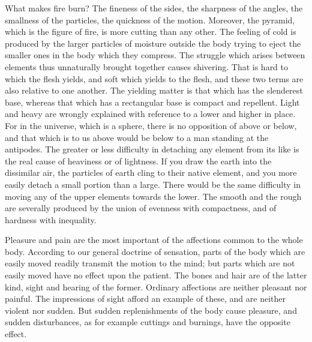 \documentclass[11pt,letter]{article}
\begin{document}
\par  What makes fire burn? The fineness of the sides, the sharpness of the angles, the smallness of the particles, the quickness of the motion. Moreover, the pyramid, which is the figure of fire, is more cutting than any other. The feeling of cold is produced by the larger particles of moisture outside the body trying to eject the smaller ones in the body which they compress. The struggle which arises between elements thus unnaturally brought together causes shivering. That is hard to which the flesh yields, and soft which yields to the flesh, and these two terms are also relative to one another. The yielding matter is that which has the slenderest base, whereas that which has a rectangular base is compact and repellent. Light and heavy are wrongly explained with reference to a lower and higher in place. For in the universe, which is a sphere, there is no opposition of above or below, and that which is to us above would be below to a man standing at the antipodes. The greater or less difficulty in detaching any element from its like is the real cause of heaviness or of lightness. If you draw the earth into the dissimilar air, the particles of earth cling to their native element, and you more easily detach a small portion than a large. There would be the same difficulty in moving any of the upper elements towards the lower. The smooth and the rough are severally produced by the union of evenness with compactness, and of hardness with inequality.

\par  Pleasure and pain are the most important of the affections common to the whole body. According to our general doctrine of sensation, parts of the body which are easily moved readily transmit the motion to the mind; but parts which are not easily moved have no effect upon the patient. The bones and hair are of the latter kind, sight and hearing of the former. Ordinary affections are neither pleasant nor painful. The impressions of sight afford an example of these, and are neither violent nor sudden. But sudden replenishments of the body cause pleasure, and sudden disturbances, as for example cuttings and burnings, have the opposite effect.
\end{document}
